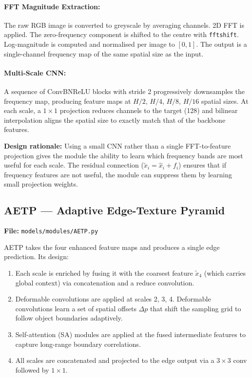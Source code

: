 \documentclass[12pt,a4paper]{report}
\begin{document}
\paragraph{FFT Magnitude Extraction:} The raw RGB image is converted to greyscale by averaging channels. 2D FFT is applied. The zero-frequency component is shifted to the centre with \texttt{fftshift}. Log-magnitude is computed and normalised per image to $[0,1]$. The output is a single-channel frequency map of the same spatial size as the input.

\paragraph{Multi-Scale CNN:} A sequence of ConvBNReLU blocks with stride 2 progressively downsamples the frequency map, producing feature maps at $H/2$, $H/4$, $H/8$, $H/16$ spatial sizes. At each scale, a $1\times1$ projection reduces channels to the target (128) and bilinear interpolation aligns the spatial size to exactly match that of the backbone features.

\textbf{Design rationale:} Using a small CNN rather than a single FFT-to-feature projection gives the module the ability to learn which frequency bands are most useful for each scale. The residual connection ($\tilde{x}_i = \hat{x}_i + f_i$) ensures that if frequency features are not useful, the module can suppress them by learning small projection weights.

\subsection{AETP — Adaptive Edge-Texture Pyramid}

\textbf{File:} \texttt{models/modules/AETP.py}

AETP takes the four enhanced feature maps and produces a single edge prediction. Its design:
\begin{enumerate}
  \item Each scale is enriched by fusing it with the coarsest feature $\tilde{x}_4$ (which carries global context) via concatenation and a reduce convolution.
  \item Deformable convolutions are applied at scales 2, 3, 4. Deformable convolutions learn a set of spatial offsets $\Delta p$ that shift the sampling grid to follow object boundaries adaptively.
  \item Self-attention (SA) modules are applied at the fused intermediate features to capture long-range boundary correlations.
  \item All scales are concatenated and projected to the edge output via a $3\times3$ conv followed by $1\times1$.
\end{enumerate}
\end{document}
